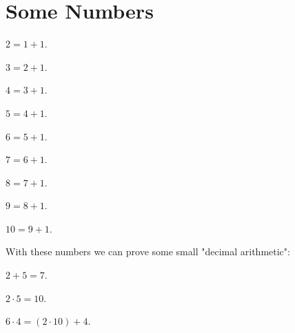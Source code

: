 \documentclass{article}
\begin{document}
\section{Some Numbers}

\begin{forthel}

\begin{definition}
$2 = 1 + 1$.
\end{definition}

\begin{definition}
$3 = 2 + 1$.
\end{definition}

\begin{definition}
$4 = 3 + 1$.
\end{definition}

\begin{definition}
$5 = 4 + 1$.
\end{definition}

\begin{definition}
$6 = 5 + 1$.
\end{definition}

\begin{definition}
$7 = 6 + 1$.
\end{definition}

\begin{definition}
$8 = 7 + 1$.
\end{definition}

\begin{definition}
$9 = 8 + 1$.
\end{definition}

\begin{definition}
$10 = 9 + 1$.
\end{definition}
\end{forthel}
With these numbers we can prove some small "decimal arithmetic":
\begin{forthel}

\begin{lemma}
$2 + 5 = 7$.
\end{lemma}

\begin{lemma}
$2 \cdot 5 = 10$.
\end{lemma}

\begin{lemma}
$6 \cdot 4 = (2 \cdot 10) + 4$.
\end{lemma}


\end{forthel}
\end{document}
